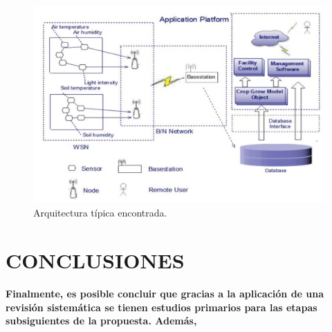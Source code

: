 \documentclass[10pt, twocolumn]{article}
\begin{document}
\begin{figure}[!ht]
	\centering
	\includegraphics[scale=0.5]{common_architecture.png}
	\caption{Arquitectura típica encontrada.}
\end{figure}

\section{CONCLUSIONES}
\paragraph{Finalmente, es posible concluir que gracias a la aplicación de una revisión sistemática se tienen estudios primarios para las etapas subsiguientes de la propuesta. Además, }



\end{document}
